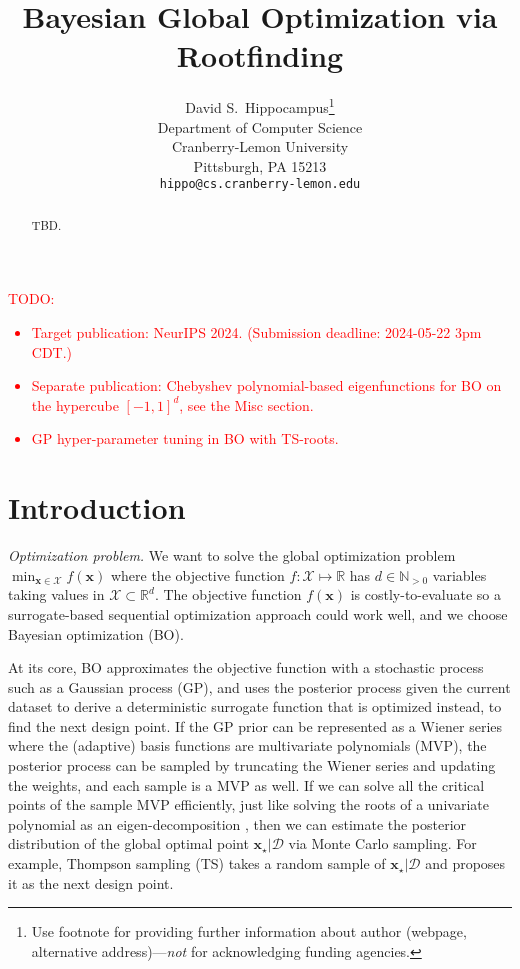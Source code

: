 \documentclass{article}
\title{Bayesian Global Optimization via Rootfinding}
\author{%
  David S.~Hippocampus\thanks{Use footnote for providing further information
    about author (webpage, alternative address)---\emph{not} for acknowledging
    funding agencies.} \\
  Department of Computer Science\\
  Cranberry-Lemon University\\
  Pittsburgh, PA 15213 \\
  \texttt{hippo@cs.cranberry-lemon.edu} \\
}
\begin{document}
\maketitle


\begin{abstract}
  TBD.
\end{abstract}

\textcolor{red}{TODO:
\begin{itemize}
\item
  Target publication: NeurIPS 2024. (Submission deadline: 2024-05-22 3pm
  CDT.)
\item
  Separate publication: Chebyshev polynomial-based eigenfunctions for BO
  on the hypercube $[-1, 1]^d$, see the Misc section.
\item
  GP hyper-parameter tuning in BO with TS-roots.
\end{itemize}
}

\section{Introduction}

\emph{Optimization problem.} We want to solve the global optimization
problem $\min_{\mathbf{x} \in \mathcal{X}} f(\mathbf{x})$ where the
objective function $f: \mathcal{X} \mapsto \mathbb{R}$ has
$d \in \mathbb{N}_{>0}$ variables taking values in
$\mathcal{X} \subset \mathbb{R}^d$. The objective function
$f(\mathbf{x})$ is costly-to-evaluate so a surrogate-based sequential
optimization approach could work well, and we choose Bayesian
optimization (BO).

At its core, BO approximates the objective function with a stochastic
process such as a Gaussian process (GP), and uses the posterior process
given the current dataset to derive a deterministic surrogate function
that is optimized instead, to find the next design point. If the GP
prior can be represented as a Wiener series where the (adaptive) basis
functions are multivariate polynomials (MVP), the posterior process can
be sampled by truncating the Wiener series and updating the weights, and
each sample is a MVP as well. If we can solve all the critical points of
the sample MVP efficiently, just like solving the roots of a univariate
polynomial as an eigen-decomposition \cite{Trefethen2019}, then we can
estimate the posterior distribution of the global optimal point
$\mathbf{x}_\star|\mathcal{D}$ via Monte Carlo sampling. For example,
Thompson sampling (TS) takes a random sample of
$\mathbf{x}_\star|\mathcal{D}$ and proposes it as the next design
point.
\end{document}
